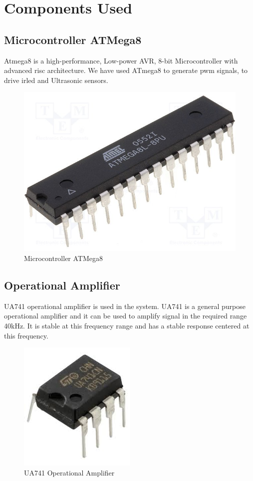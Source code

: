 \section{Components Used}

\subsection{Microcontroller ATMega8}
Atmega8 is a high-performance, Low-power AVR, 8-bit Microcontroller with advanced \gls{risc} architecture. We have used ATmega8 to generate \gls{pwm} signals, to drive \gls{irled} and Ultrasonic sensors.
\begin{figure}[h!]
	\centering
	\includegraphics[scale=0.2]{Images/Atmega8.jpg}
	\caption{Microcontroller ATMega8}
	\label{fig:ATMega8}
\end{figure}

\subsection{Operational Amplifier}
UA741 operational amplifier is used in the system. UA741 is a general purpose operational amplifier and it can be used to amplify signal in the required range 40kHz. It is stable at this frequency range and has a stable response centered at this frequency.
\begin{figure}[h!]
	\centering
	\includegraphics[scale=0.3]{Images/Opamp741.jpg}
	\caption{UA741 Operational Amplifier}
	\label{fig:Opamp741}
\end{figure}

